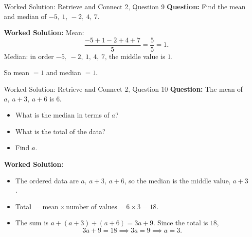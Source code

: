 \documentclass{beamer}
\begin{document}
\begin{frame}{Worked Solution: Retrieve and Connect 2, Question 9}
\small
\textbf{Question:} Find the mean and median of \(-5,\ 1,\ -2,\ 4,\ 7\).

\smallskip
\textbf{Worked Solution:} Mean:
\[
\frac{-5+1-2+4+7}{5}=\frac{5}{5}=1.
\]
Median: in order \(-5,\ -2,\ 1,\ 4,\ 7\), the middle value is \(1\).

So mean \(=1\) and median \(=1\).
\end{frame}

\begin{frame}{Worked Solution: Retrieve and Connect 2, Question 10}
\small
\textbf{Question:} The mean of \(a,\ a+3,\ a+6\) is \(6\).
\begin{itemize}
  \item What is the median in terms of \(a\)?
  \item What is the total of the data?
  \item Find \(a\).
\end{itemize}

\smallskip
\textbf{Worked Solution:}
\begin{itemize}
  \item The ordered data are \(a,\ a+3,\ a+6\), so the median is the middle value, \(a+3\).
  \item Total \(= \text{mean} \times \text{number of values} = 6 \times 3 = 18\).
  \item The sum is \(a+(a+3)+(a+6)=3a+9\). Since the total is \(18\),
  \[
  3a+9=18 \implies 3a=9 \implies a=3.
  \]
\end{itemize}
\end{frame}
\end{document}
